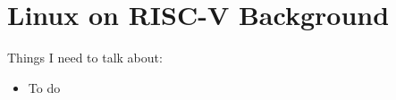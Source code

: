 \chapter{Linux on RISC-V Background}
\label{chapter:background}


Things I need to talk about:
\begin{itemize}
    \item To do
\end{itemize}{}

\newpage
